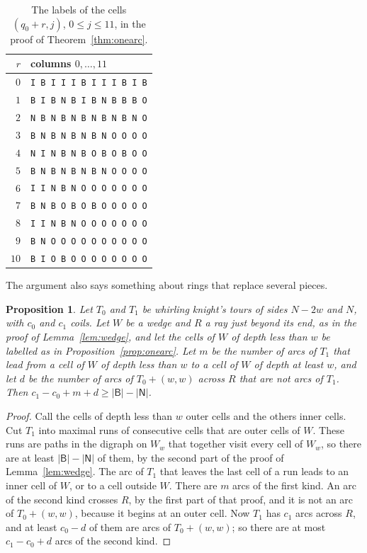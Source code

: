 \documentclass[11pt]{amsart}
\newtheorem{proposition}[theorem]{Proposition}
\theoremstyle{remark}
\begin{document}
\begin{table}[t]
\centering
\begin{tabular}{r@{\quad}l}
$r$ & columns $0,\dots,11$\\ \hline
$0$ & \texttt{I B I I I B I I I B I B}\\
$1$ & \texttt{B I B N B I B N B B B O}\\
$2$ & \texttt{N B N B N B N B N B N O}\\
$3$ & \texttt{B N B N B N B N O O O O}\\
$4$ & \texttt{N I N B N B O B O B O O}\\
$5$ & \texttt{B N B N B N B N O O O O}\\
$6$ & \texttt{I I N B N O O O O O O O}\\
$7$ & \texttt{B N B O B O B O O O O O}\\
$8$ & \texttt{I I N B N O O O O O O O}\\
$9$ & \texttt{B N O O O O O O O O O O}\\
$10$ & \texttt{B I O B O O O O O O O O}
\end{tabular}
\caption{The labels of the cells $(q_0+r,j)$, $0\le j\le11$, in the proof of Theorem~\ref{thm:onearc}.}
\label{tab:head}
\end{table}

The argument also says something about rings that replace several pieces.

\begin{proposition}\label{prop:several}
Let $T_0$ and $T_1$ be whirling knight's tours of sides $N-2w$ and $N$, with $c_0$ and $c_1$ coils. Let $W$ be a
wedge and $R$ a ray just beyond its end, as in the proof of Lemma~\ref{lem:wedge}, and let the cells of $W$ of depth
less than $w$ be labelled as in Proposition~\ref{prop:onearc}. Let $m$ be the number of arcs of $T_1$ that lead from
a cell of $W$ of depth less than $w$ to a cell of $W$ of depth at least $w$, and let $d$ be the number of arcs of
$T_0+(w,w)$ across $R$ that are not arcs of $T_1$. Then $c_1-c_0+m+d\ge|\mathsf B|-|\mathsf N|$.
\end{proposition}
\begin{proof}
Call the cells of depth less than $w$ outer cells and the others inner cells. Cut $T_1$ into maximal runs of
consecutive cells that are outer cells of $W$. These runs are paths in the digraph on $W_w$ that together visit
every cell of $W_w$, so there are at least $|\mathsf B|-|\mathsf N|$ of them, by the second part of the proof of
Lemma~\ref{lem:wedge}. The arc of $T_1$ that leaves the last cell of a run leads to an inner cell of $W$, or to a
cell outside $W$. There are $m$ arcs of the first kind. An arc of the second kind crosses $R$, by the first part of
that proof, and it is not an arc of $T_0+(w,w)$, because it begins at an outer cell. Now $T_1$ has $c_1$ arcs across
$R$, and at least $c_0-d$ of them are arcs of $T_0+(w,w)$; so there are at most $c_1-c_0+d$ arcs of the second kind.
\end{proof}
\end{document}
